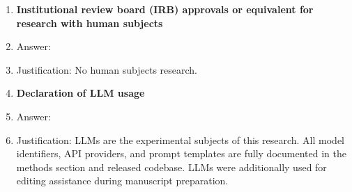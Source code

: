 \begin{enumerate}
\item {\bf Institutional review board (IRB) approvals or equivalent for research with human subjects}
    \item[] Answer: \answerNA{}
    \item[] Justification: No human subjects research.

\item {\bf Declaration of LLM usage}
    \item[] Answer: \answerYes{}
    \item[] Justification: LLMs are the experimental subjects of this research. All model identifiers, API providers, and prompt templates are fully documented in the methods section and released codebase. LLMs were additionally used for editing assistance during manuscript preparation.

\end{enumerate}
